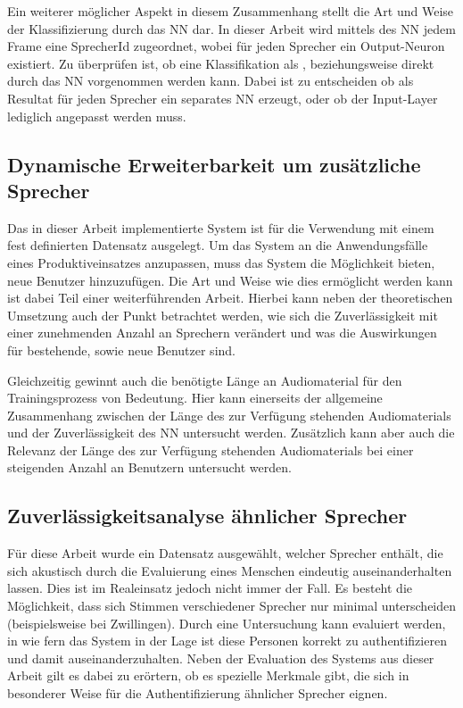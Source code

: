 Ein weiterer möglicher Aspekt in diesem Zusammenhang stellt die Art und Weise der Klassifizierung durch das \ac{NN} dar.
In dieser Arbeit wird mittels des \ac{NN} jedem Frame eine SprecherId zugeordnet, wobei für jeden Sprecher ein Output-Neuron existiert.
Zu überprüfen ist, ob eine Klassifikation als , beziehungsweise  direkt durch das \ac{NN} vorgenommen werden kann.
Dabei ist zu entscheiden ob als Resultat für jeden Sprecher ein separates \ac{NN} erzeugt, oder ob der Input-Layer lediglich angepasst werden muss.

\subsection{Dynamische Erweiterbarkeit um zusätzliche Sprecher}
Das in dieser Arbeit implementierte System ist für die Verwendung mit einem fest definierten Datensatz ausgelegt.
Um das System an die Anwendungsfälle eines Produktiveinsatzes anzupassen, muss das System die Möglichkeit bieten, neue Benutzer hinzuzufügen.
Die Art und Weise wie dies ermöglicht werden kann ist dabei Teil einer weiterführenden Arbeit.
Hierbei kann neben der theoretischen Umsetzung auch der Punkt betrachtet werden, wie sich die Zuverlässigkeit mit einer zunehmenden Anzahl an Sprechern verändert und was die Auswirkungen für bestehende, sowie neue Benutzer sind.

Gleichzeitig gewinnt auch die benötigte Länge an Audiomaterial für den Trainingsprozess von Bedeutung.
Hier kann einerseits der allgemeine Zusammenhang zwischen der Länge des zur Verfügung stehenden Audiomaterials und der Zuverlässigkeit des \ac{NN} untersucht werden.
Zusätzlich kann aber auch die Relevanz der Länge des zur Verfügung stehenden Audiomaterials bei einer steigenden Anzahl an Benutzern untersucht werden.

\subsection{Zuverlässigkeitsanalyse ähnlicher Sprecher}
Für diese Arbeit wurde ein Datensatz ausgewählt, welcher Sprecher enthält, die sich akustisch durch die Evaluierung eines Menschen eindeutig auseinanderhalten lassen.
Dies ist im Realeinsatz jedoch nicht immer der Fall.
Es besteht die Möglichkeit, dass sich Stimmen verschiedener Sprecher nur minimal unterscheiden (beispielsweise bei Zwillingen).
Durch eine Untersuchung kann evaluiert werden, in wie fern das System in der Lage ist diese Personen korrekt zu authentifizieren und damit auseinanderzuhalten.
Neben der Evaluation des Systems aus dieser Arbeit gilt es dabei zu erörtern, ob es spezielle Merkmale gibt, die sich in besonderer Weise für die Authentifizierung ähnlicher Sprecher eignen.

